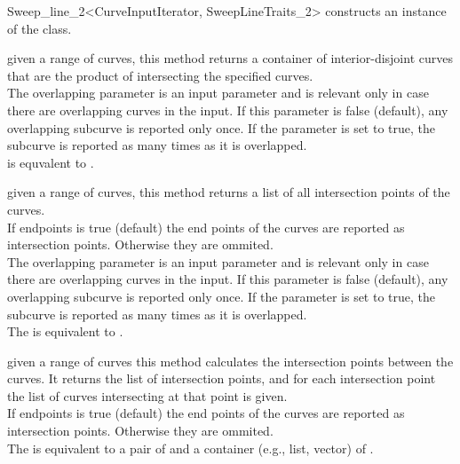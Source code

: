 \begin{ccRefClass}{Sweep_line_2<CurveInputIterator, SweepLineTraits_2>}
   {constructs an instance of the  class.}
    

\ccTypes
{}

\ccQueryFunctions

{given a range of curves, this method returns a container of 
interior-disjoint curves that are the product of intersecting 
the specified curves. 
\\The overlapping parameter is an input parameter and is relevant 
only in case there are overlapping curves in the input. If this parameter 
is false (default), any overlapping subcurve is reported only once. If the 
parameter is set to true, the subcurve is reported as many times as it 
is overlapped.
\\ is equvalent to 
.}

{given a range of curves, this method returns a list of all intersection
points of the curves. 
\\If endpoints is true (default) the end points
of the curves are reported as intersection points. Otherwise they are 
ommited. 
\\The overlapping parameter is an input parameter and is relevant 
only in case there are overlapping curves in the input. If this parameter 
is false (default), any overlapping subcurve is reported only once. If the 
parameter is set to true, the subcurve is reported as many times as it 
is overlapped.
\\The {} is equivalent to
.}


{given a range of curves this method calculates the intersection points
between the curves. It returns the list of intersection points,
and for each intersection point the list of curves intersecting
at that point is given. 
\\If endpoints is true (default) the end points
of the curves are reported as intersection points. Otherwise they are 
ommited.
\\The {} is equivalent to a pair of 
 and a container (e.g., list, vector) of .}
 


\end{ccRefClass}
